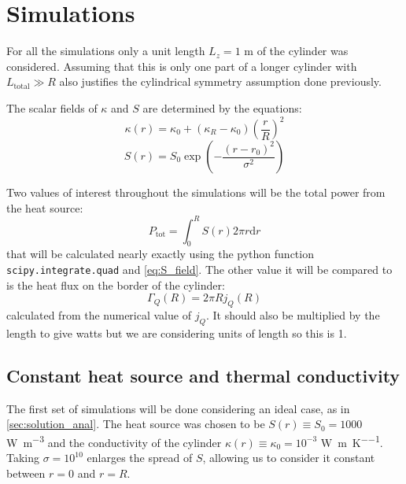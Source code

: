 \section{Simulations}

For all the simulations only a unit length $L_z = 1$ \si{\meter} of the cylinder was considered. Assuming that this is only one part of a longer cylinder with $L_\mathrm{total} \gg R$ also justifies the cylindrical symmetry assumption done previously.

The scalar fields of $\kappa$ and $S$ are determined by the equations:
\begin{equation}
    \kappa(r) = \kappa_0 + (\kappa_R - \kappa_0)\left(\frac{r}{R}\right)^2
    \label{eq:kappa_field}
\end{equation}
\begin{equation}
    S(r) = S_0\exp\left(-\frac{(r-r_0)^2}{\sigma^2}\right)
    \label{eq:S_field}
\end{equation}

Two values of interest throughout the simulations will be the total power from the heat source:
\begin{equation}
    P_\mathrm{tot} = \int_0^R S(r)2\pi r \mathrm{d}r
    \label{eq:ptot_source}
\end{equation}
that will be calculated nearly exactly using the python function \texttt{scipy.integrate.quad} and \autoref{eq:S_field}. The other value it will be compared to is the heat flux on the border of the cylinder:
\begin{equation}
    \Gamma_Q(R) = 2\pi Rj_Q(R)
    \label{eq:flux_border}
\end{equation}
calculated from the numerical value of $j_Q$. It should also be multiplied by the length to give watts but we are considering units of length so this is 1.

\subsection{Constant heat source and thermal conductivity}
\label{sec:simu_constant}

The first set of simulations will be done considering an ideal case, as in \autoref{sec:solution_anal}. The heat source was chosen to be \(S(r) \equiv S_0 = 1000\) \si{\watt\per\cubic\meter} and the conductivity of the cylinder \(\kappa(r) \equiv \kappa_0 = 10^{-3}\) \si{\watt\per\meter\per\kelvin}. Taking \(\sigma = 10^{10}\) enlarges the spread of \(S\), allowing us to consider it constant between \(r=0\) and \(r=R\).

